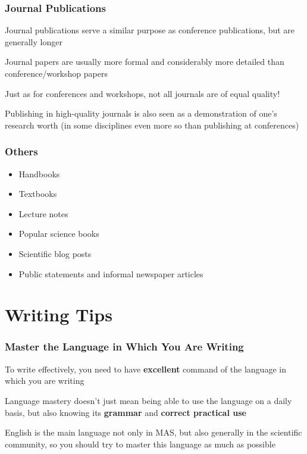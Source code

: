 \documentclass{beamer}
\begin{document}
\begin{frame}
\frametitle{Journal Publications}
    \vspace{-1cm}
    Journal publications serve a similar purpose as conference publications, but are generally longer
    \newline

    Journal papers are usually more formal and considerably more detailed than conference/workshop papers
    \newline

    Just as for conferences and workshops, not all journals are of equal quality!
    \newline

    Publishing in high-quality journals is also seen as a demonstration of one's research worth (in some disciplines even more so than publishing at conferences)
\end{frame}

\begin{frame}
\frametitle{Others}
    \vspace{-1cm}
    \begin{itemize}
        \item Handbooks
        \item Textbooks
        \item Lecture notes
        \item Popular science books
        \item Scientific blog posts
        \item Public statements and informal newspaper articles
    \end{itemize}
\end{frame}

\section{Writing Tips}

\begin{frame}
\frametitle{Master the Language in Which You Are Writing}
    \vspace{-1cm}
    To write effectively, you need to have \textbf{excellent} command of the language in which you are writing
    \newline

    Language mastery doesn't just mean being able to use the language on a daily basis, but also knowing its \textbf{grammar} and \textbf{correct practical use}
    \newline

    English is the main language not only in MAS, but also generally in the scientific community, so you should try to master this language as much as possible
\end{frame}
\end{document}
